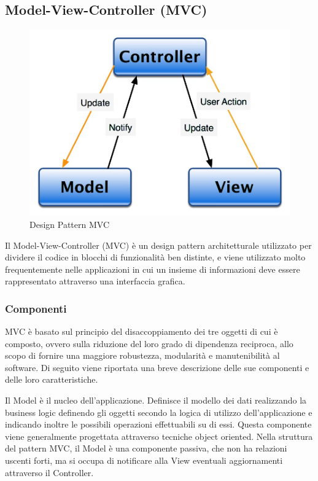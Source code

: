 \documentclass[a4paper, titlepage]{article}
\begin{document}
\subsection{Model-View-Controller (MVC)}
\begin{figure}[htp]
\centering
\includegraphics[scale=0.50]{Img/MVC.jpg}
\caption{Design Pattern MVC}
\label{} 
\end{figure}
Il Model-View-Controller (MVC) è un design pattern architetturale utilizzato per dividere il codice in blocchi di funzionalità ben distinte, e viene utilizzato molto frequentemente nelle applicazioni in cui un insieme di informazioni deve essere rappresentato attraverso una interfaccia grafica.

\subsubsection{Componenti}
MVC è basato sul principio del disaccoppiamento dei tre oggetti di cui è composto, ovvero sulla riduzione del loro grado di dipendenza reciproca, allo scopo di fornire una maggiore robustezza, modularità e manutenibilità al software.
\newline Di seguito viene riportata una breve descrizione delle sue componenti e delle loro caratteristiche.

Il Model è il nucleo dell’applicazione. Definisce il modello dei dati realizzando la business logic definendo gli oggetti secondo la logica di utilizzo dell’applicazione e indicando inoltre le possibili operazioni effettuabili su di essi.
\newline Questa componente viene generalmente progettata attraverso tecniche object oriented.
\newline Nella struttura del pattern MVC, il Model è una componente passiva, che non ha relazioni uscenti forti, ma si occupa di notificare alla View eventuali aggiornamenti attraverso il Controller.
\end{document}
